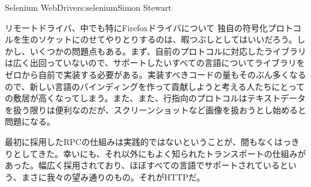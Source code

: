 \begin{aosachapter}{Selenium WebDriver}{s:selenium}{Simon Stewart}
\begin{aosasect1}{リモートドライバ、中でも特にFirefoxドライバについて}
独自の符号化プロトコルを生のソケットにのせてやりとりするのは、暇つぶしとしてはいいだろう。しかし、いくつかの問題点もある。まず、自前のプロトコルに対応したライブラリは広く出回っていないので、サポートしたいすべての言語についてライブラリをゼロから自前で実装する必要がある。実装すべきコードの量もそのぶん多くなるので、新しい言語のバインディングを作って貢献しようと考える人たちにとっての敷居が高くなってしまう。また、また、行指向のプロトコルはテキストデータを扱う限りは便利なのだが、スクリーンショットなど画像を扱おうとし始めると問題になる。

最初に採用したRPCの仕組みは実践的ではないということが、間もなくはっきりとしてきた。幸いにも、それ以外にもよく知られたトランスポートの仕組みがあった。幅広く採用されており、ほぼすべての言語でサポートされているという、まさに我々の望み通りのもの。それがHTTPだ。


\end{aosasect1}
\end{aosachapter}
